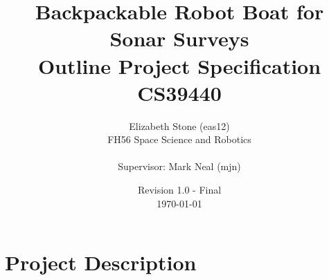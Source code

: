 \documentclass[titlepage 12pt]{article}
\title{Backpackable Robot Boat for Sonar Surveys\\ Outline Project Specification\\ CS39440}
\author{ Elizabeth Stone (eas12)\\FH56 Space Science and Robotics\\ \\Supervisor: Mark Neal (mjn) }
\date{Revision 1.0 - Final\\ \today\vspace{-3em} }
\begin{document}
{
\selectfont


\begin{titlepage}
	\clearpage\maketitle
\thispagestyle{empty}
	 \vspace{250pt}

	
\end{titlepage}





\section{Project Description}

}
\end{document}
